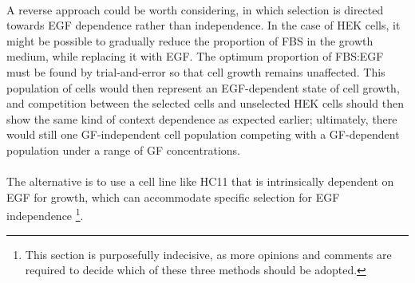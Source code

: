 \documentclass[12pt, letterpaper, onecolumn]{article}
\begin{document}
	\paragraph{\empty}A reverse approach could be worth considering, in which selection is directed towards EGF dependence rather than independence. In the case of HEK cells, it might be possible to gradually reduce the proportion of FBS in the growth medium, while replacing it with EGF. The optimum proportion of FBS:EGF must be found by trial-and-error so that cell growth remains unaffected. This population of cells would then represent an EGF-dependent state of cell growth, and competition between the selected cells and unselected HEK cells should then show the same kind of context dependence as expected earlier; ultimately, there would still one GF-independent cell population competing with a GF-dependent population under a range of GF concentrations.
	
	\paragraph{\empty}The alternative is to use a cell line like HC11 that is intrinsically dependent on EGF for growth, which can accommodate specific selection for EGF independence \footnote{This section is purposefully indecisive, as more opinions and comments are required to decide which of these three methods should be adopted.}.


	
	
	
\end{document}
